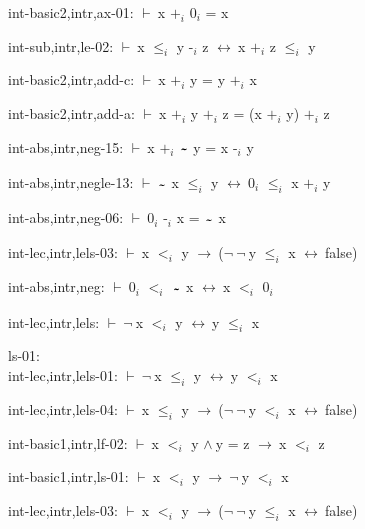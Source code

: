 \documentclass[a4paper]{article}
\newcommand{\tildesym}{\raisebox{-4pt}{\bf\~{}}}
\newcommand{\Fol}{\mbox{$\vdash\ $}}
\newcommand{\Not}{\mbox{$\neg\ $}}
\newcommand{\And}{\mbox{$\wedge\ $}}
\newcommand{\Imp}{\mbox{$\rightarrow\ $}}
\newcommand{\Equiv}{\mbox{$\leftrightarrow\ $}}
\begin{document}
int-basic2,intr,ax-01: 
 \Fol x $\mbox{+}_{i}$ $\mbox{0}_{i}$ = x



int-sub,intr,le-02: 
 \Fol x $\mbox{$\le$}_{i}$ y $\mbox{-}_{i}$ z \Equiv x $\mbox{+}_{i}$ z $\mbox{$\le$}_{i}$ y



int-basic2,intr,add-c: 
 \Fol x $\mbox{+}_{i}$ y = y $\mbox{+}_{i}$ x



int-basic2,intr,add-a: 
 \Fol x $\mbox{+}_{i}$ y $\mbox{+}_{i}$ z = (x $\mbox{+}_{i}$ y) $\mbox{+}_{i}$ z



int-abs,intr,neg-15: 
 \Fol x $\mbox{+}_{i}$ $\tildesym$ y = x $\mbox{-}_{i}$ y



int-abs,intr,negle-13: 
 \Fol $\tildesym$ x $\mbox{$\le$}_{i}$ y \Equiv $\mbox{0}_{i}$ $\mbox{$\le$}_{i}$ x $\mbox{+}_{i}$ y



int-abs,intr,neg-06: 
 \Fol $\mbox{0}_{i}$ $\mbox{-}_{i}$ x = $\tildesym$ x



int-lec,intr,lels-03: 
 \Fol x $\mbox{$<$}_{i}$ y \Imp (\Not \Not y $\mbox{$\le$}_{i}$ x \Equiv false)



int-abs,intr,neg: 
 \Fol $\mbox{0}_{i}$ $\mbox{$<$}_{i}$ $\tildesym$ x \Equiv x $\mbox{$<$}_{i}$ $\mbox{0}_{i}$



int-lec,intr,lels: 
 \Fol \Not x $\mbox{$<$}_{i}$ y \Equiv y $\mbox{$\le$}_{i}$ x



\bigskip

ls-01:\\ int-lec,intr,lels-01: 
 \Fol \Not x $\mbox{$\le$}_{i}$ y \Equiv y $\mbox{$<$}_{i}$ x



int-lec,intr,lels-04: 
 \Fol x $\mbox{$\le$}_{i}$ y \Imp (\Not \Not y $\mbox{$<$}_{i}$ x \Equiv false)



int-basic1,intr,lf-02: 
 \Fol x $\mbox{$<$}_{i}$ y \And y = z \Imp x $\mbox{$<$}_{i}$ z



int-basic1,intr,ls-01: 
 \Fol x $\mbox{$<$}_{i}$ y \Imp \Not y $\mbox{$<$}_{i}$ x



int-lec,intr,lels-03: 
 \Fol x $\mbox{$<$}_{i}$ y \Imp (\Not \Not y $\mbox{$\le$}_{i}$ x \Equiv false)
\end{document}
